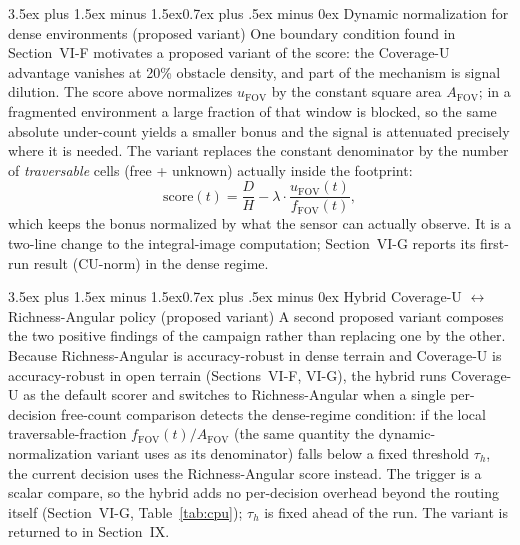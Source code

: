 \documentclass[journal]{IEEEtran}
\makeatletter
\newcommand{\CU}{Coverage-U}
\newcommand{\RA}{Richness-Angular}
\newcommand{\ucnt}{u_{\mathrm{FOV}}}
\newcommand{\fcnt}{f_{\mathrm{FOV}}}
\newcommand{\farea}{A_{\mathrm{FOV}}}
\renewcommand{\subsection}{\@startsection{subsection}{2}{\z@}%
{3.5ex plus 1.5ex minus 1.5ex}{0.7ex plus .5ex minus 0ex}%
{\normalfont\normalsize\bfseries}}
\makeatother
\begin{document}
\subsection{Dynamic normalization for dense environments (proposed variant)}
One boundary condition found in Section~VI-F motivates a proposed variant of
the score: the \CU{} advantage vanishes at 20\% obstacle density, and part of
the mechanism is signal dilution. The score above normalizes
$\ucnt$ by the constant square area $\farea$; in a
fragmented environment a large fraction of that window is blocked, so the same
absolute under-count yields a smaller bonus and the signal is attenuated
precisely where it is needed. The variant replaces the constant denominator by
the number of \emph{traversable} cells (free + unknown) actually inside the
footprint:
\begin{equation}
\mathrm{score}(t) = \frac{D}{H} - \lambda \cdot
\frac{\ucnt(t)}{\fcnt(t)},
\end{equation}
which keeps the bonus normalized by what the sensor can actually observe. It
is a two-line change to the integral-image computation; Section~VI-G reports
its first-run result (CU-norm) in the dense regime.

\subsection{Hybrid \CU{} $\leftrightarrow$ \RA{} policy (proposed variant)}
A second proposed variant composes the two positive findings of the campaign
rather than replacing one by the other. Because \RA{} is accuracy-robust in
dense terrain and \CU{} is accuracy-robust in open terrain (Sections~VI-F,
VI-G), the hybrid runs \CU{} as the default scorer and switches to \RA{} when a
single per-decision free-count comparison detects the dense-regime condition:
if the local traversable-fraction $\fcnt(t)/\farea$ (the same quantity the
dynamic-normalization variant uses as its denominator) falls below a fixed
threshold $\tau_h$, the current decision uses the \RA{} score instead. The
trigger is a scalar compare, so the hybrid adds no per-decision overhead beyond
the routing itself (Section~VI-G, Table~\ref{tab:cpu}); $\tau_h$ is fixed
ahead of the run. The variant is returned to in Section~IX.
\end{document}
